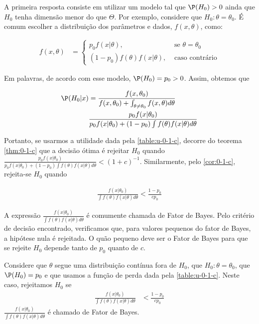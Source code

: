 A primeira resposta consiste em 
utilizar um modelo tal que
$\P(H_{0}) > 0$ ainda que $H_{0}$ 
tenha dimensão menor do que $\Theta$.
Por exemplo, considere que $H_{0}:\theta=\theta_{0}$.
É comum escolher a distribuição dos 
parâmetros e dados, $f(x,\theta)$, como:

\begin{align*}
 f(x,\theta) &=
 \begin{cases}
  p_{0}f(x|\theta), & \text{ se } 
  \theta = \theta_{0} \\
  (1-p_{0})f(\theta)f(x|\theta), 
  & \text{ caso contrário}
 \end{cases}
\end{align*}

Em palavras, de acordo com esse modelo, 
$\P(H_{0}) = p_{0} > 0$. Assim, obtemos que

\begin{align*}
 \P(H_{0}|x)
 &= \frac{f(x,\theta_{0})}{f(x,\theta_{0}) 
 +\int_{\theta \neq \theta_{0}}{f(x,\theta)d\theta}} \\
 &\frac{p_{0}f(x|\theta_{0})}{p_{0}f(x|\theta_{0}) 
 +(1-p_{0})\int{f(\theta)f(x|\theta)d\theta}}
\end{align*}

Portanto, se usarmos a utilidade 
dada pela \cref{table:u-0-1-c},
decorre do teorema \cref{thm:0-1-c} que 
a decisão ótima é rejeitar $H_{0}$ quando
$\frac{p_{0}f(x|\theta_{0})}{p_{0}f(x|\theta_{0}) +(1-p_{0})\int{f(\theta)f(x|\theta)d\theta}} < (1+c)^{-1}$.
Similarmente, pelo \cref{cor:0-1-c}, 
rejeita-se $H_{0}$ quando

\begin{align*}
 \frac{f(x|\theta_{0})}{\int{f(\theta)f(x|\theta)d\theta}}
 <\frac{1-p_{0}}{cp_{0}}
\end{align*}

A expressão $\frac{f(x|\theta_{0})}{\int{f(\theta)f(x|\theta)d\theta}}$ é 
comumente chamada de Fator de Bayes.
Pelo critério de decisão encontrado, verificamos que,
para valores pequenos do fator de Bayes, 
a hipótese nula é rejeitada.
O quão pequeno deve ser o Fator de Bayes para que 
se rejeite $H_{0}$ depende tanto de $p_{0}$ 
quanto de $c$.

\begin{corollary}
 \label{cor:bayes-factor}
 Considere que $\theta$ segue 
 uma distribuição contínua fora de $H_{0}$, que
 $H_{0}: \theta = \theta_{0}$, 
 que $\P(H_{0}) = p_{0}$ e
 que usamos a função de perda 
 dada pela \cref{table:u-0-1-c}.
 Neste caso, rejeitamos $H_{0}$ se
 \begin{align*}
  \frac{f(x|\theta_{0})}
  {\int{f(\theta)f(x|\theta)d\theta}}
  &< \frac{1-p_{0}}{cp_{0}}
 \end{align*}
 $\frac{f(x|\theta_{0})}{\int{f(\theta)f(x|\theta)d\theta}}$ é 
 chamado de Fator de Bayes.
\end{corollary}

